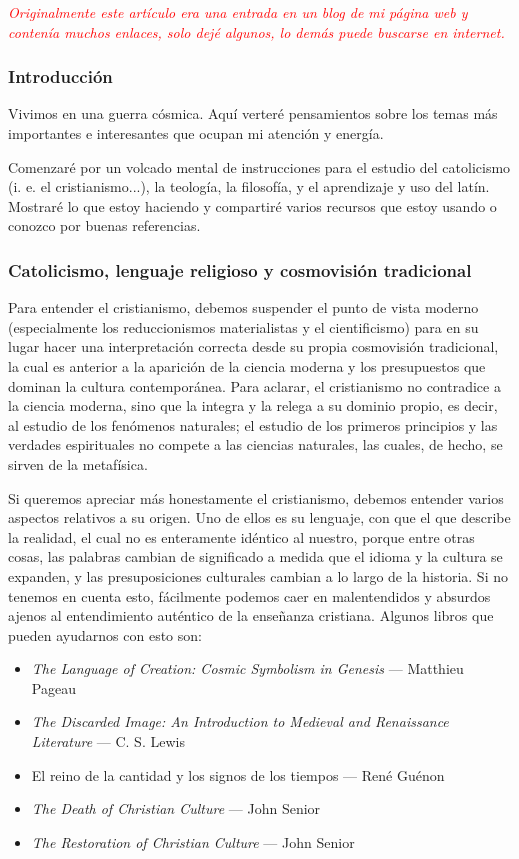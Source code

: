 \documentclass[12pt]{article}
\begin{document}
\textcolor{red}{\textit{Originalmente este artículo era una entrada en un blog
de mi página web y contenía muchos enlaces, solo dejé algunos, lo demás puede
buscarse en internet.}}


	\subsubsection*{Introducción}

Vivimos en una guerra cósmica. Aquí verteré pensamientos sobre los temas más
importantes e interesantes que ocupan mi atención y energía.

Comenzaré por un volcado mental de instrucciones para el estudio del catolicismo
(i. e. el cristianismo...), la teología, la filosofía, y el aprendizaje y uso
del latín. Mostraré lo que estoy haciendo y compartiré varios recursos que estoy
usando o conozco por buenas referencias.

\subsubsection*{Catolicismo, lenguaje religioso y cosmovisión tradicional}

Para entender el cristianismo, debemos suspender el punto de vista moderno
(especialmente los reduccionismos materialistas y el cientificismo) para en su
lugar hacer una interpretación correcta desde su propia cosmovisión tradicional,
la cual es anterior a la aparición de la ciencia moderna y los presupuestos que
dominan la cultura contemporánea. Para aclarar, el cristianismo no contradice a
la ciencia moderna, sino que la integra y la relega a su dominio propio, es
decir, al estudio de los fenómenos naturales; el estudio de los primeros
principios y las verdades espirituales no compete a las ciencias naturales, las
cuales, de hecho, se sirven de la metafísica.

Si queremos apreciar más honestamente el cristianismo, debemos entender varios
aspectos relativos a su origen. Uno de ellos es su lenguaje, con que el que
describe la realidad, el cual no es enteramente idéntico al nuestro, porque
entre otras cosas, las palabras cambian de significado a medida que el idioma y
la cultura se expanden, y las presuposiciones culturales cambian a lo largo de
la historia. Si no tenemos en cuenta esto, fácilmente podemos caer en
malentendidos y absurdos ajenos al entendimiento auténtico de la enseñanza
cristiana. Algunos libros que pueden ayudarnos con esto son:

\begin{itemize}
	\item \textit{The Language of Creation: Cosmic Symbolism in Genesis} ---
		Matthieu Pageau
	\item \textit{The Discarded Image: An Introduction to Medieval and
		Renaissance Literature} --- C. S. Lewis
	\item El reino de la cantidad y los signos de los tiempos ---
		René Guénon
	\item \textit{The Death of Christian Culture} --- John Senior
	\item \textit{The Restoration of Christian Culture} --- John Senior
\end{itemize}
\end{document}
